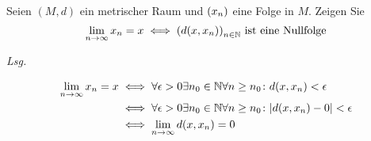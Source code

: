 \documentclass{article}
\begin{document}
\newpage
Seien $(M, d)$ ein metrischer Raum und $\qty(x_n)$ eine Folge in $M$.
Zeigen Sie
\[
  \lim_{n \to \infty} x_n = x \iff \qty(d\qty(x, x_n))_{n \in \mathbb{N}} \text{ ist eine Nullfolge}
\]

\textit{Lsg.}

\begin{align*}
  \lim_{n \to \infty} x_n = x &\iff \forall \epsilon > 0 \exists n_0 \in \mathbb{N} \forall n \geq n_0 \colon d(x, x_n) < \epsilon \\
                              &\iff \forall \epsilon > 0 \exists n_0 \in \mathbb{N} \forall n \geq n_0 \colon \abs{d(x, x_n) - 0} < \epsilon \\
                              &\iff \lim_{n \to \infty} d(x, x_n) = 0 \\
\end{align*}
\end{document}

